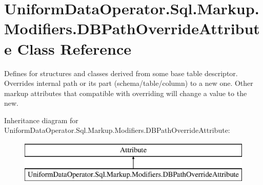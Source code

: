 \hypertarget{class_uniform_data_operator_1_1_sql_1_1_markup_1_1_modifiers_1_1_d_b_path_override_attribute}{}\section{Uniform\+Data\+Operator.\+Sql.\+Markup.\+Modifiers.\+D\+B\+Path\+Override\+Attribute Class Reference}
\label{class_uniform_data_operator_1_1_sql_1_1_markup_1_1_modifiers_1_1_d_b_path_override_attribute}


Defines for structures and classes derived from some base table descriptor. Overrides internal path or its part (schema/table/column) to a new one. Other markup attributes that compatible with overriding will change a value to the new.  


Inheritance diagram for Uniform\+Data\+Operator.\+Sql.\+Markup.\+Modifiers.\+D\+B\+Path\+Override\+Attribute\+:\begin{figure}[H]
\begin{center}
\leavevmode
\includegraphics[height=2.000000cm]{d0/d9c/class_uniform_data_operator_1_1_sql_1_1_markup_1_1_modifiers_1_1_d_b_path_override_attribute}
\end{center}
\end{figure}
